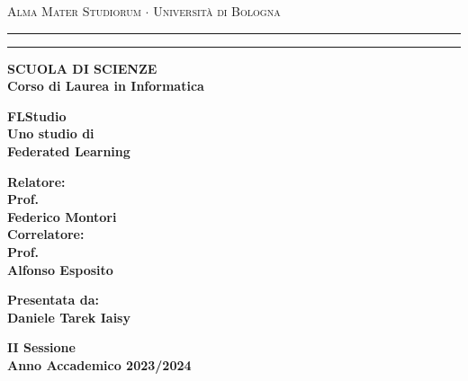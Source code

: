 \documentclass[12pt, a4paper]{report}
\begin{document}
\begin{titlepage}
\begin{center}
{{\Large{\textsc{Alma Mater Studiorum $\cdot$ Universit\`a di
Bologna}}}} \rule[0.1cm]{15.8cm}{0.1mm}
\rule[0.5cm]{15.8cm}{0.6mm}
{\small{\bf SCUOLA DI SCIENZE\\
Corso di Laurea in Informatica }}
\end{center}
\vspace{15mm}
\begin{center}
{\LARGE{\bf FLStudio}}\\
\vspace{3mm}
{\LARGE{\bf Uno studio di}}\\
\vspace{3mm}
{\LARGE{\bf Federated Learning}}\\
\end{center}
\vspace{40mm}
\par
\noindent
\begin{minipage}[t]{0.47\textwidth}
    \large{\bf Relatore:\\
    Prof.\\
    Federico Montori\\[1em]
    Correlatore:\\
    Prof.\\
    Alfonso Esposito}
\end{minipage}
\hfill
\begin{minipage}[t]{0.47\textwidth}\raggedleft
    \large{\bf Presentata da:\\
    Daniele Tarek Iaisy}
\end{minipage}
\vspace{20mm}
\begin{center}
{\large{\bf II Sessione\\
Anno Accademico 2023/2024}}
\end{center}
\end{titlepage}
\end{document}
